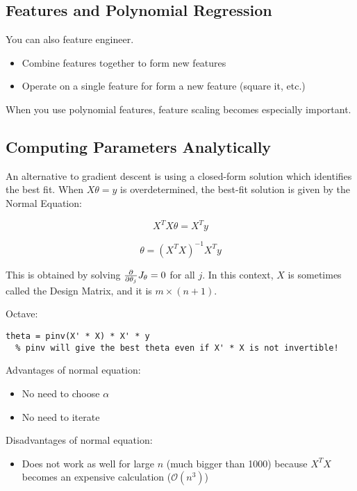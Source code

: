 \subsection{Features and Polynomial Regression}

You can also feature engineer.

\begin{itemize}
  \item Combine features together to form new features
  \item Operate on a single feature for form a new feature (square it, etc.)
\end{itemize}

When you use polynomial features, feature scaling becomes especially important.

\subsection{Computing Parameters Analytically}

An alternative to gradient descent is using a closed-form solution which identifies the best fit.
When $X\theta = y$ is overdetermined, the best-fit solution is given by the Normal Equation:

\[ X^T X \theta = X^T y \]

\[ \theta = (X^T X)^{-1} X^T y \]

This is obtained by solving $\pdv{\theta_j}J_{\theta} = 0$ for all $j$.
In this context, $X$ is sometimes called the Design Matrix, and it is $m \times (n + 1)$.

Octave:

\begin{lstlisting}[style=Matlab-editor]
  theta = pinv(X' * X) * X' * y
  % pinv will give the best theta even if X' * X is not invertible!
\end{lstlisting}

Advantages of normal equation:

\begin{itemize}
  \item No need to choose $\alpha$
  \item No need to iterate
\end{itemize}

Disadvantages of normal equation:

\begin{itemize}
  \item Does not work as well for large $n$ (much bigger than 1000) 
    because $X^T X$ becomes an expensive calculation ($\mathcal{O}(n^3)$)
\end{itemize}

